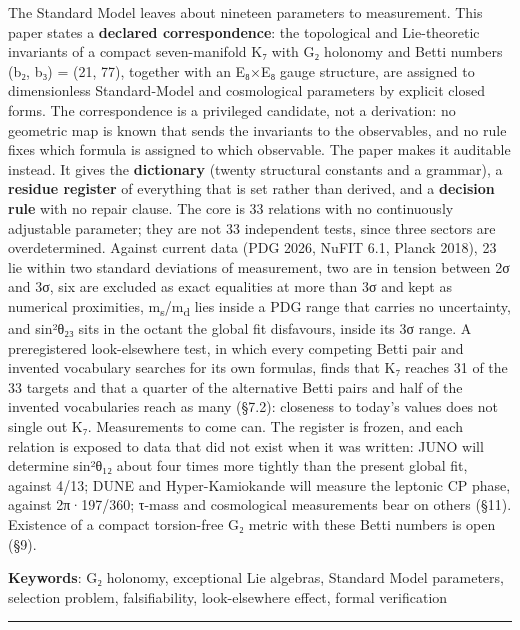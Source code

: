 \documentclass[11pt,a4paper]{article}
\begin{document}
The Standard Model leaves about nineteen parameters to measurement. This paper states a \textbf{declared correspondence}: the topological and Lie-theoretic invariants of a compact seven-manifold K₇ with G₂ holonomy and Betti numbers (b₂, b₃) = (21, 77), together with an E₈×E₈ gauge structure, are assigned to dimensionless Standard-Model and cosmological parameters by explicit closed forms. The correspondence is a privileged candidate, not a derivation: no geometric map is known that sends the invariants to the observables, and no rule fixes which formula is assigned to which observable. The paper makes it auditable instead. It gives the \textbf{dictionary} (twenty structural constants and a grammar), a \textbf{residue register} of everything that is set rather than derived, and a \textbf{decision rule} with no repair clause. The core is 33 relations with no continuously adjustable parameter; they are not 33 independent tests, since three sectors are overdetermined. Against current data (PDG 2026, NuFIT 6.1, Planck 2018), 23 lie within two standard deviations of measurement, two are in tension between 2σ and 3σ, six are excluded as exact equalities at more than 3σ and kept as numerical proximities, m\textsubscript{s}/m\textsubscript{d} lies inside a PDG range that carries no uncertainty, and sin²θ₂₃ sits in the octant the global fit disfavours, inside its 3σ range. A preregistered look-elsewhere test, in which every competing Betti pair and invented vocabulary searches for its own formulas, finds that K₇ reaches 31 of the 33 targets and that a quarter of the alternative Betti pairs and half of the invented vocabularies reach as many (§7.2): closeness to today's values does not single out K₇. Measurements to come can. The register is frozen, and each relation is exposed to data that did not exist when it was written: JUNO will determine sin²θ₁₂ about four times more tightly than the present global fit, against 4/13; DUNE and Hyper-Kamiokande will measure the leptonic CP phase, against 2π·197/360; τ-mass and cosmological measurements bear on others (§11). Existence of a compact torsion-free G₂ metric with these Betti numbers is open (§9).

\textbf{Keywords}: G₂ holonomy, exceptional Lie algebras, Standard Model parameters, selection problem, falsifiability, look-elsewhere effect, formal verification

\newpage
\setcounter{tocdepth}{1}
\tableofcontents
\newpage

\begin{center}\rule{\linewidth}{0.5pt}\end{center}
\end{document}
